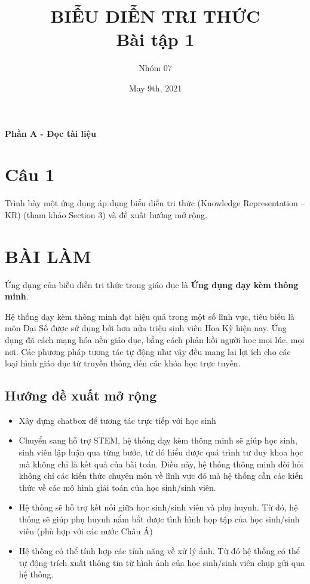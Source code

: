 \documentclass{article}
\title{BIỄU DIỄN TRI THỨC\\ Bài tập 1}
\author{Nhóm 07}
\date{May 9th, 2021}
\begin{document}
	\maketitle
	\begin{center}
		\Large{\textbf{Phần A - Đọc tài liệu}}
	\end{center}
	\section*{Câu 1}
	Trình bày một ứng dụng áp dụng biểu diễn tri thức (Knowledge Representation – KR) (tham khảo Section 3) và đề xuất hướng mở rộng.
	
	\section*{BÀI LÀM}
	Ứng dụng của biễu diễn tri thức trong giáo dục là \textbf{Ứng dụng dạy kèm thông minh}.
	
	Hệ thống dạy kèm thông minh đạt hiệu quả trong một số lĩnh vực, tiêu biểu là môn Đại Số được sử dụng bởi hơn nửa triệu sinh viên Hoa Kỳ hiện nay. Ứng dụng đã cách mạng hóa nền giáo dục, bằng cách phản hồi người học mọi lúc, mọi nơi. Các phương pháp tương tác tự động như vậy đều mang lại lợi ích cho các loại hình giáo dục từ truyền thống đến các khóa học trực tuyến.
	
	\subsection*{Hướng đề xuất mở rộng}
	\begin{itemize}
		\item Xây dựng chatbox để tương tác trực tiếp với học sinh
		\item Chuyển sang hỗ trợ STEM, hệ thống dạy kèm thông minh sẽ giúp học sinh, sinh viên lập luận qua từng bước, từ đó hiểu được quá trình tư duy khoa học mà không chỉ là kết quả của bài toán. Điều này, hệ thống thông minh đòi hỏi không chỉ các kiến thức chuyên môn về  lĩnh vực đó mà hệ thống cần các kiến thức về các mô hình giải toán của học sinh/sinh viên.
		\item Hệ thống sẽ hỗ trợ kết nối giữa học sinh/sinh viên và phụ huynh. Từ đó, hệ thống sẽ giúp phụ huynh nắm bắt được tình hình họp tập của học sinh/sinh viên (phù hợp với các nước Châu Á)
		\item Hệ thống có thể tính hợp các tính năng về xử lý ảnh. Từ đó hệ thống có thể tự động trích xuất thông tin từ hình ảnh của học sinh/sinh viên chụp gửi qua hệ thống.
		
	\end{itemize}
\end{document}
